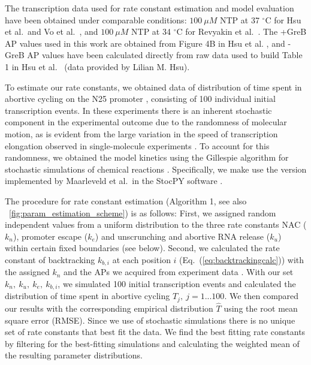 The transcription data used for rate constant estimation and model evaluation
have been obtained under comparable conditions: $100\ \mu M$ NTP at 37
$^{\circ}$C for Hsu et al.\ and Vo et al.\
\cite{hsu_initial_2006,vo_vitro_2003-1}, and $100\ \mu M$ NTP at 34
$^{\circ}$C for Revyakin et al.\ \cite{revyakin_abortive_2006}. The +GreB AP
values used in this work are obtained from Figure 4B in Hsu et al.
\cite{hsu_initial_2006}, and -GreB AP values have been calculated directly
from raw data used to build Table 1 in Hsu et al.\ \cite{hsu_initial_2006}
(data provided by Lilian M. Hsu).



To estimate our rate constants, we obtained data of distribution of time spent
in abortive cycling on the N25 promoter \cite{revyakin_abortive_2006},
consisting of 100 individual initial transcription events. In these
experiments there is an inherent stochastic component in the experimental
outcome due to the randomness of molecular motion, as is evident from
the large variation in the speed of transcription elongation observed in
single-molecule experiments \cite{adelman_single_2002,
tolic-norrelykke_diversity_2004}. To account for this randomness, we obtained
the model kinetics using the Gillespie algorithm for stochastic simulations of
chemical reactions \cite{gillespie_exact_1977}. Specifically, we make use the
version implemented by Maarleveld et al.\ in the StocPY software
\cite{maarleveld_stochpy:_2013}.

The procedure for rate constant estimation (Algorithm 1, see also
\FIG~\ref{fig:param_estimation_scheme}) is as follows: First, we assigned
random independent values from a uniform distribution to the three rate
constants NAC ($k_n$), promoter escape ($k_e$) and unscrunching and abortive
RNA release ($k_u$) within certain fixed boundaries (see below). Second,
we calculated the rate constant of backtracking $k_{b,i}$ at each position
$i$ (Eq.~(\ref{eq:backtrackingcalc})) with the assigned $k_n$ and the APs we
acquired from experiment data \cite{hsu_initial_2006}. With our set ${k_n,\
k_u,\ k_e,\ k_{b,i}}$, we simulated 100 initial transcription events and
calculated the distribution of time spent in abortive cycling $T_j,\
j=1...100$. We then compared our results with the corresponding empirical
distribution $\hat T$ \cite{revyakin_abortive_2006} using the root mean
square error (RMSE). Since we use of stochastic simulations there is no unique
set of rate constants that best fit the data. We find the best fitting rate
constants by filtering for the best-fitting simulations and calculating the
weighted mean of the resulting parameter distributions.

